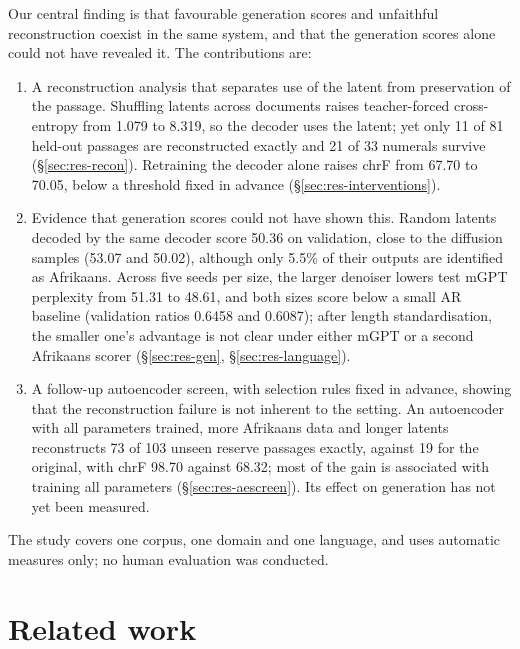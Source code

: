 \documentclass[11pt,a4paper]{article}
\begin{document}
Our central finding is that favourable generation scores and unfaithful reconstruction coexist in the same system, and that the generation scores alone could not have revealed it. The contributions are:
\begin{enumerate}
\item A reconstruction analysis that separates use of the latent from preservation of the passage. Shuffling latents across documents raises teacher-forced cross-entropy from 1.079 to 8.319, so the decoder uses the latent; yet only 11 of 81 held-out passages are reconstructed exactly and 21 of 33 numerals survive (\S\ref{sec:res-recon}). Retraining the decoder alone raises chrF from 67.70 to 70.05, below a threshold fixed in advance (\S\ref{sec:res-interventions}).
\item Evidence that generation scores could not have shown this. Random latents decoded by the same decoder score 50.36 on validation, close to the diffusion samples (53.07 and 50.02), although only 5.5\% of their outputs are identified as Afrikaans. Across five seeds per size, the larger denoiser lowers test mGPT perplexity from 51.31 to 48.61, and both sizes score below a small AR baseline (validation ratios 0.6458 and 0.6087); after length standardisation, the smaller one's advantage is not clear under either mGPT or a second Afrikaans scorer (\S\ref{sec:res-gen}, \S\ref{sec:res-language}).
\item A follow-up autoencoder screen, with selection rules fixed in advance, showing that the reconstruction failure is not inherent to the setting. An autoencoder with all parameters trained, more Afrikaans data and longer latents reconstructs 73 of 103 unseen reserve passages exactly, against 19 for the original, with chrF 98.70 against 68.32; most of the gain is associated with training all parameters (\S\ref{sec:res-aescreen}). Its effect on generation has not yet been measured.
\end{enumerate}

The study covers one corpus, one domain and one language, and uses automatic measures only; no human evaluation was conducted.

\section{Related work}
\end{document}
